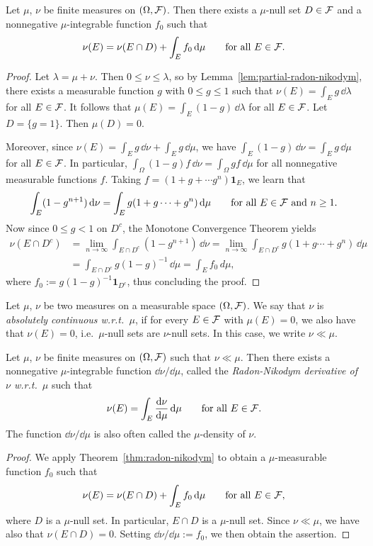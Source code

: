 \begin{theorem}\label{thm:radon-nikodym}
	Let $\mu$, $\nu$ be finite measures on $(\Omega,\mathcal F)$. Then there exists a $\mu$-null set $D\in\mathcal F$ and a nonnegative $\mu$-integrable function $f_0$ such that
	\[
		\nu(E) = \nu(E\cap D) + \int_E f_0\,\mathrm{d}\mu\qquad\text{for all $E\in\mathcal F$}.
	\]
\end{theorem}
\begin{proof}
	Let $\lambda=\mu+\nu$. Then $0\le \nu\le \lambda$, so by Lemma~\ref{lem:partial-radon-nikodym}, there exists a measurable function $g$ with $0\le g\le 1$ such that $\nu(E)=\int_E g\,\dd\lambda$ for all $E\in\mathcal F$. It follows that
	$\mu(E) = \int_E (1-g)\,\dd\lambda$ for all $E\in\mathcal F$. Let $D=\{g=1\}$. Then $\mu(D) = 0$. 
	
	Moreover, since $\nu(E)=\int_E g\,\dd\nu + \int_E g\,\dd\mu$, we have $\int_E (1-g)\,\dd\nu = \int_E g\,\dd\mu$ for all $E\in\mathcal F$. In particular, $\int_\Omega (1-g)f\,\dd\nu = \int_\Omega gf\,\dd\mu$ for all nonnegative measurable functions $f$. Taking $f=(1+g +\cdots g^n)\mathbf{1}_E$, we learn that
	\[
		\int_E (1-g^{n+1})\,\mathrm{d}\nu = \int_E g(1+g\cdots+g^n)\,\mathrm{d}\mu\qquad\text{for all $E\in\mathcal F$ and $n\ge 1$}.
	\]
	Now since $0\le g <1$ on $D^c$, the Monotone Convergence Theorem yields
	\begin{align*}
		\nu(E\cap D^c) &= \lim_{n\to\infty} \int_{E\cap D^c} (1-g^{n+1})\,\dd\nu = \lim_{n\to\infty}\int_{E\cap D^c} g(1+g\cdots+g^n)\,\dd\mu \\
		&=\int_{E\cap D^c} g(1-g)^{-1}\,\dd\mu = \int_E f_0\,d\mu,
	\end{align*}
	where $f_0:= g(1-g)^{-1}\mathbf{1}_{D^c}$, thus concluding the proof.
\end{proof}

\begin{definition}
	Let $\mu$, $\nu$ be two measures on a measurable space $(\Omega, \mathcal F)$.
	We say that $\nu$ is \emph{absolutely continuous w.r.t.\ $\mu$}, if for every $E\in\mathcal F$ with $\mu(E)=0$, we also have that $\nu(E)=0$, i.e.\ $\mu$-null sets are $\nu$-null sets. In this case, we write $\nu\ll\mu$.
\end{definition}

\begin{theorem} 
	Let $\mu$, $\nu$ be finite measures on $(\Omega,\mathcal F)$ such that $\nu\ll \mu$. Then there exists a nonnegative $\mu$-integrable function $\dd\nu/\dd\mu$, called the \emph{Radon-Nikodym derivative of $\nu$ w.r.t.\ $\mu$} such that
	\[
		\nu(E) = \int_E \frac{\mathrm{d}\nu}{\mathrm{d}\mu}\,\mathrm{d}\mu\qquad\text{for all $E\in\mathcal F$}.
	\]
	The function $\dd\nu/\dd\mu$ is also often called the $\mu$-density of $\nu$.
\end{theorem}
\begin{proof}
	We apply Theorem~\ref{thm:radon-nikodym} to obtain a $\mu$-measurable function $f_0$ such that
	\[
		\nu(E) = \nu(E\cap D) + \int_E f_0\,\mathrm{d}\mu \qquad\text{for all $E\in\mathcal F$},
	\]
	where $D$ is a $\mu$-null set. In particular, $E\cap D$ is a $\mu$-null set. Since $\nu\ll \mu$, we have also that $\nu(E\cap D)=0$. Setting $\dd\nu/\dd\mu:= f_0$, we then obtain the assertion.
\end{proof}

